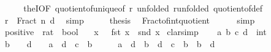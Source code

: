 \begin{isabellebody}
%
\isadelimproof
%
\endisadelimproof
%
\isatagproof
{}\isamarkupfalse%
\ {\isacharminus}{\kern0pt}\isanewline
\ \ \isamarkupfalse%
\ theI{\isacharprime}{\kern0pt}{\isacharbrackleft}{\kern0pt}OF\ quotient{\isacharunderscore}{\kern0pt}of{\isacharunderscore}{\kern0pt}unique{\isacharbrackleft}{\kern0pt}of\ r{\isacharbrackright}{\kern0pt}{\isacharcomma}{\kern0pt}\ unfolded\ r{\isacharbrackleft}{\kern0pt}unfolded\ quotient{\isacharunderscore}{\kern0pt}of{\isacharunderscore}{\kern0pt}def{\isacharbrackright}{\kern0pt}{\isacharbrackright}{\kern0pt}\isanewline
\ \ \isamarkupfalse%
\ {\isachardoublequoteopen}r\ {\isacharequal}{\kern0pt}\ Fract\ n\ d{\isachardoublequoteclose}\ \isamarkupfalse%
\ simp\isanewline
\ \ \isamarkupfalse%
\ \isamarkupfalse%
\ {\isacharquery}{\kern0pt}thesis\ \isamarkupfalse%
\ Fract{\isacharunderscore}{\kern0pt}of{\isacharunderscore}{\kern0pt}int{\isacharunderscore}{\kern0pt}quotient\isanewline
\ \ \ \ \isamarkupfalse%
\ simp\isanewline
{}\isamarkupfalse%
%
\endisatagproof
{\isafoldproof}%
%
\isadelimproof
%
\endisadelimproof
%
\isadelimdocument
%
\endisadelimdocument
%
\isatagdocument
%
\isamarkuptrue%
%
\endisatagdocument
{\isafolddocument}%
%
\isadelimdocument
%
\endisadelimdocument
{}\isamarkupfalse%
\ positive\ {\isacharcolon}{\kern0pt}{\isacharcolon}{\kern0pt}\ {\isachardoublequoteopen}rat\ {\isasymRightarrow}\ bool{\isachardoublequoteclose}\isanewline
\ \ \ {\isachardoublequoteopen}{\isasymlambda}x{\isachardot}{\kern0pt}\ {}\ {\isacharless}{\kern0pt}\ fst\ x\ {\isacharasterisk}{\kern0pt}\ snd\ x{\isachardoublequoteclose}\isanewline
%
\isadelimproof
%
\endisadelimproof
%
\isatagproof
{}\isamarkupfalse%
\ clarsimp\isanewline
\ \ \isamarkupfalse%
\ a\ b\ c\ d\ {\isacharcolon}{\kern0pt}{\isacharcolon}{\kern0pt}\ int\isanewline
\ \ \isamarkupfalse%
\ {\isachardoublequoteopen}b\ {\isasymnoteq}\ {}{\isachardoublequoteclose}\ \ {\isachardoublequoteopen}d\ {\isasymnoteq}\ {}{\isachardoublequoteclose}\ \ {\isachardoublequoteopen}a\ {\isacharasterisk}{\kern0pt}\ d\ {\isacharequal}{\kern0pt}\ c\ {\isacharasterisk}{\kern0pt}\ b{\isachardoublequoteclose}\isanewline
\ \ \isamarkupfalse%
\ \isamarkupfalse%
\ {\isachardoublequoteopen}a\ {\isacharasterisk}{\kern0pt}\ d\ {\isacharasterisk}{\kern0pt}\ b\ {\isacharasterisk}{\kern0pt}\ d\ {\isacharequal}{\kern0pt}\ c\ {\isacharasterisk}{\kern0pt}\ b\ {\isacharasterisk}{\kern0pt}\ b\ {\isacharasterisk}{\kern0pt}\ d{\isachardoublequoteclose}\isanewline

\end{isabellebody}
